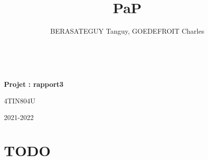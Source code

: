 \documentclass[10pt, a4paper]{article}
\title{PaP}
\author{BERASATEGUY Tanguy, GOEDEFROIT Charles}
\begin{document}
\begin{titlepage}
  \centering
  \ {} %
  \vfill
  \vspace{1cm}
  {\scshape\LARGE\MyTitle\par}
  \vspace{0.5cm}
  {\huge\bfseries Projet : rapport3\par}
  \vspace{0.5cm}
  {\Large 4TIN804U\par}
  \vspace{1cm}
  \MyAuthor
  \vfill
  {\large2021-2022\par}
\end{titlepage}

\newpage

\tableofcontents

\newpage

\section{TODO}
\end{document}
